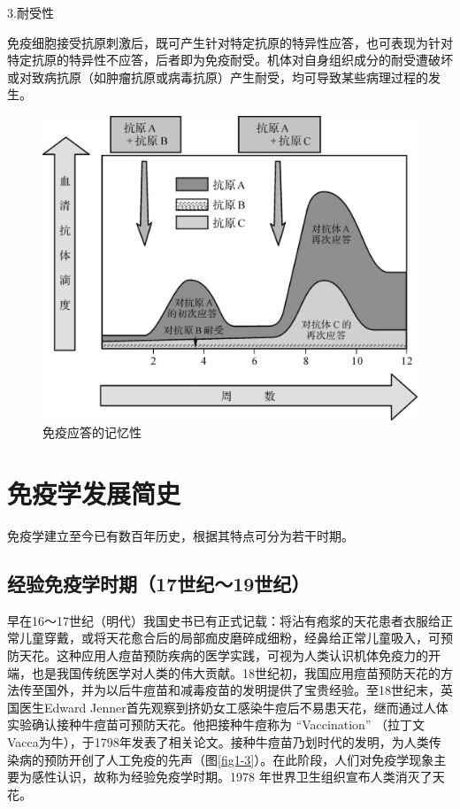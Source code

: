 3.耐受性

免疫细胞接受抗原刺激后，既可产生针对特定抗原的特异性应答，也可表现为针对特定抗原的特异性不应答，后者即为免疫耐受。机体对自身组织成分的耐受遭破坏或对致病抗原（如肿瘤抗原或病毒抗原）产生耐受，均可导致某些病理过程的发生。

\begin{figure}[!htbp]
 \centering
 \includegraphics[scale=1.1]{./images/Image00009.jpg}
 \caption{免疫应答的记忆性}
 \label{fig1-2}
  \end{figure} 

\section{免疫学发展简史}

免疫学建立至今已有数百年历史，根据其特点可分为若干时期。


\subsection{经验免疫学时期（17世纪～19世纪）}

早在16～17世纪（明代）我国史书已有正式记载：将沾有疱浆的天花患者衣服给正常儿童穿戴，或将天花愈合后的局部痂皮磨碎成细粉，经鼻给正常儿童吸入，可预防天花。这种应用人痘苗预防疾病的医学实践，可视为人类认识机体免疫力的开端，也是我国传统医学对人类的伟大贡献。18世纪初，我国应用痘苗预防天花的方法传至国外，并为以后牛痘苗和减毒疫苗的发明提供了宝贵经验。至18世纪末，英国医生Edward
Jenner首先观察到挤奶女工感染牛痘后不易患天花，继而通过人体实验确认接种牛痘苗可预防天花。他把接种牛痘称为
“Vaccination”
（拉丁文Vacca为牛），于1798年发表了相关论文。接种牛痘苗乃划时代的发明，为人类传染病的预防开创了人工免疫的先声（图\ref{fig1-3}）。在此阶段，人们对免疫学现象主要为感性认识，故称为经验免疫学时期。1978
年世界卫生组织宣布人类消灭了天花。

